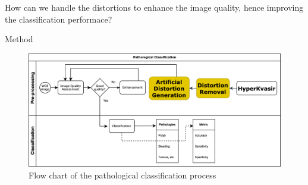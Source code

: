 \documentclass{libs/ufc_format}
\newcommand{\tikzmark}[1]{\tikz[overlay,remember picture] \node (#1) {};}
\begin{document}






\begin{frame}
    \centering
    \large How can we handle the distortions to enhance the image quality, hence improving the classification performace?
\end{frame}
\begin{frame}{Method}
    \begin{figure}
        \centering
        \includegraphics[scale=0.09]{libs/algorithm.png}
        \caption{ Flow chart of the pathological classification process}
        \label{fig:al}
    \end{figure}
\end{frame}
\end{document}
